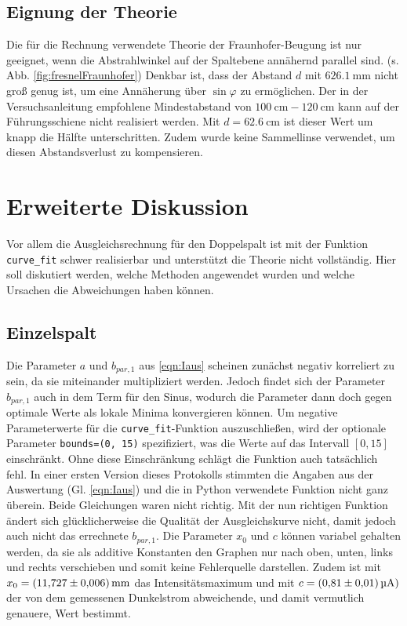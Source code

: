 \subsection{Eignung der Theorie}
Die für die Rechnung verwendete Theorie der Fraunhofer-Beugung ist nur geeignet, wenn die Abstrahlwinkel auf der Spaltebene annähernd parallel sind. (s. Abb. \ref{fig:fresnelFraunhofer})
Denkbar ist, dass der Abstand $d$ mit $\SI{626.1}{\milli\meter}$ nicht groß genug ist, um eine Annäherung über $\sin{\varphi}$ zu ermöglichen.
Der in der Versuchsanleitung empfohlene Mindestabstand von $\SI{100}{\centi\meter} - \SI{120}{\centi\meter}$ kann auf der Führungsschiene nicht realisiert werden.
Mit $d = \SI{62.6}{\centi\meter}$ ist dieser Wert um knapp die Hälfte unterschritten. Zudem wurde keine Sammellinse verwendet, um diesen Abstandsverlust zu kompensieren.



\section{Erweiterte Diskussion}
\label{sec:Erweiterte Diskussion}
Vor allem die Ausgleichsrechnung für den Doppelspalt ist mit der Funktion \texttt{curve\_fit} schwer realisierbar und unterstützt die Theorie nicht vollständig.
Hier soll diskutiert werden, welche Methoden angewendet wurden und welche Ursachen die Abweichungen haben können.

\subsection{Einzelspalt}
Die Parameter $a$ und $b_{par, 1}$ aus \eqref{eqn:Iaus} scheinen zunächst negativ korreliert zu sein, da sie miteinander multipliziert werden. Jedoch findet sich der Parameter $b_{par, 1}$
auch in dem Term für den Sinus, wodurch die Parameter dann doch gegen optimale Werte als lokale Minima konvergieren können. Um negative Parameterwerte für die \texttt{curve\_fit}-Funktion auszuschließen, wird der optionale Parameter \texttt{bounds=(0, 15)} spezifiziert,
was die Werte auf das Intervall $[0, 15]$ einschränkt. Ohne diese Einschränkung schlägt die Funktion auch tatsächlich fehl.
In einer ersten Version dieses Protokolls stimmten die Angaben aus der Auswertung (Gl. \eqref{eqn:Iaus}) und die in Python verwendete Funktion nicht ganz überein.
Beide Gleichungen waren nicht richtig. Mit der nun richtigen Funktion ändert sich glücklicherweise die Qualität der Ausgleichskurve nicht, damit jedoch auch nicht das errechnete $b_{par, 1}$.
Die Parameter $x_0$ und $c$ können variabel gehalten werden, da sie als additive Konstanten den Graphen nur nach oben, unten, links und rechts verschieben und somit keine
Fehlerquelle darstellen. Zudem ist mit $x_0 = \SI{11.727 \pm 0.006}{\milli\meter}$ das Intensitätsmaximum und mit $c = \SI{0.81\pm0.01}{\micro\ampere})$ der von dem gemessenen Dunkelstrom abweichende,
und damit vermutlich genauere, Wert bestimmt.

